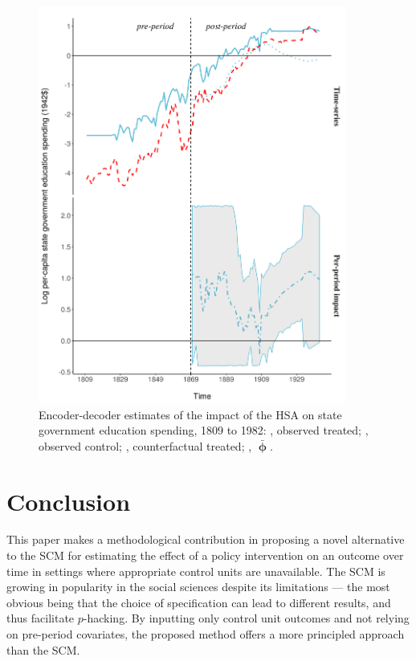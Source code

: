 \documentclass[hidelinks,12pt]{article}
\DeclareRobustCommand\sampleline[1]{%
	\tikz\draw[#1] (0,0) (0,\the\dimexpr\fontdimen22\textfont2\relax)
	-- (2em,\the\dimexpr\fontdimen22\textfont2\relax);%
}
\begin{document}
\begin{figure}[htbp]
	\centering
	\includegraphics[width=0.9\textwidth]{plots/educ-ed.png}
	\caption{Encoder-decoder estimates of the impact of the HSA on state government education spending, 1809 to 1982:		{\color{Darjeeling15}{\sampleline{}}}, observed treated;
		{\color{Darjeeling11}{\sampleline{dashed}}}, observed control;
		{\color{Darjeeling15}{\sampleline{dotted}}}, counterfactual treated;
		{\color{Darjeeling15}{\sampleline{dash pattern=on .7em off .2em on .05em off .2em}}}, $\boldsymbol{\bar{\upphi}}$.\label{educ-ed}} 
\end{figure}

\section{Conclusion} \label{conclusion}

This paper makes a methodological contribution in proposing a novel alternative to the SCM for estimating the effect of a policy intervention on an outcome over time in settings where appropriate control units are unavailable. The SCM is growing in popularity in the social sciences despite its limitations --- the most obvious being that the choice of specification can lead to different results, and thus facilitate $p$-hacking. By inputting only control unit outcomes and not relying on pre-period covariates, the proposed method offers a more principled approach than the SCM. 
\end{document}
